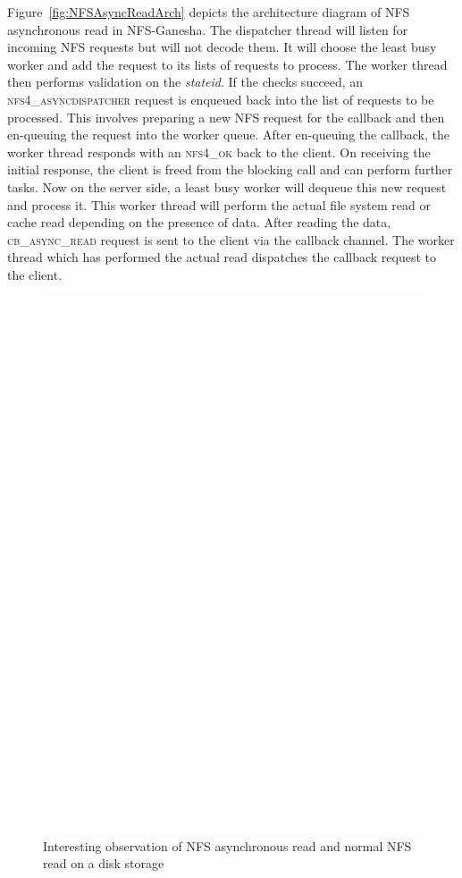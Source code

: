  Figure~\ref{fig:NFSAsyncReadArch} depicts the architecture diagram of NFS asynchronous read in NFS-Ganesha. The dispatcher thread will listen for incoming NFS requests but will not decode them. It will choose the least busy worker and add the request to its lists of requests to process. The worker thread then performs validation on the \textit{stateid}. If  the checks succeed, an \textsc{nfs4\_asyncdispatcher} request is enqueued back into the list of requests to be processed.  This involves preparing a new NFS request for the callback and then en-queuing the request into the worker queue. After en-queuing the callback, the worker thread responds with an \textsc{nfs4\_ok} back to the client. On receiving the initial response, the client is freed from the blocking call and can perform further tasks. Now on the server side, a least busy worker will dequeue this new request and process it. This worker thread will perform the actual file system read or cache read depending on the presence of data. After reading the data, \textsc{cb\_async\_read} request is sent to the client via the callback channel. The worker thread which has performed the actual read dispatches the callback request to the client. 
 
\begin{figure}
\centering
\includegraphics[scale=0.6]{figures/performancesequence.eps}
\caption{Interesting observation of NFS asynchronous read and normal NFS read on a disk storage}
\label{fig:performancesequence}
\end{figure}




 
 
 








